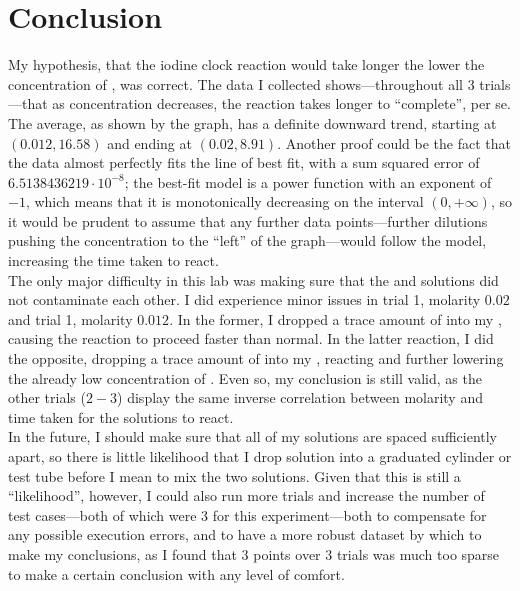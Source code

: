 \documentclass[a4paper]{article}
\begin{document}
    \section{Conclusion}
        My hypothesis, that the iodine clock reaction would take longer the lower the
        concentration of , was correct. The data I collected shows---throughout
        all 3 trials---that as  concentration decreases, the reaction takes
        longer to ``complete'', per se. The average, as shown by the graph, has a definite
        downward trend, starting at $(0.012, 16.58)$ and ending at $(0.02, 8.91)$. Another
        proof could be the fact that the data almost perfectly fits the line of best fit,
        with a sum squared error of $\num[round-precision=5]{6.5138436219}\cdot10^{-8}$;
        the best-fit model is a power function with an exponent of $-1$, which means that
        it is monotonically decreasing on the interval $(0,+\infty)$, so it would be prudent
        to assume that any further data points---further dilutions pushing the concentration
        to the ``left'' of the graph---would follow the model, increasing the time taken to
        react.
        \\
        The only major difficulty in this lab was making sure that the  and
         solutions did not contaminate each other. I did experience minor
        issues in trial 1, molarity $0.02$ and trial 1, molarity $0.012$. In the former,
        I dropped a trace amount of  into my , causing the reaction
        to proceed faster than normal. In the latter reaction, I did the opposite, dropping
        a trace amount of  into my , reacting and further lowering the
        already low concentration of . Even so, my conclusion is still valid, as the
        other trials ($2-3$) display the same inverse correlation between molarity and time
        taken for the solutions to react.
        \\
        In the future, I should make sure that all of my solutions are spaced sufficiently
        apart, so there is little likelihood that I drop solution into a graduated cylinder
        or test tube before I mean to mix the two solutions. Given that this is still
        a ``likelihood'', however, I could also run more trials and increase the number
        of test cases---both of which were 3 for this experiment---both to compensate
        for any possible execution errors, and to have a more robust dataset by which
        to make my conclusions, as I found that 3 points over 3 trials was much too
        sparse to make a certain conclusion with any level of comfort.
\end{document}
